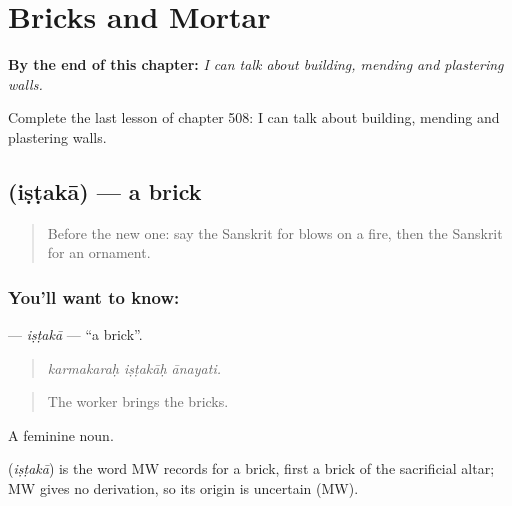 
\chapter{Bricks and Mortar}
\label{ch:sa-bricks-and-mortar}

\begin{chapteropening}
\textbf{By the end of this chapter:} \emph{I can talk about building, mending and plastering walls.}

Complete the last lesson of chapter 508: I can talk about building, mending and plastering walls.
\end{chapteropening}

\section[\texorpdfstring{\sk{इष्टका} (iṣṭakā)}{इष्टका (iṣṭakā)}]{ (iṣṭakā) — a brick}

\label{lesson:SA-C508-istaka}



\begin{quote}
Before the new one: say the Sanskrit for blows on a fire, then the Sanskrit for an ornament.
\end{quote}

\subsection*{You'll want to know: }
\textbf{} — \emph{iṣṭakā} — \textquotedblleft{}a brick\textquotedblright{}.

\begin{quote}
  
\end{quote}

\begin{quote}
\emph{karmakaraḥ iṣṭakāḥ ānayati.}
\end{quote}

\begin{quote}
The worker brings the bricks.
\end{quote}

A feminine noun.

\begin{cousinweb}
\textbf{} (\emph{iṣṭakā}) is the word MW records for a brick, first a brick of the sacrificial altar; MW gives no derivation, so its origin is uncertain (MW).
\end{cousinweb}

